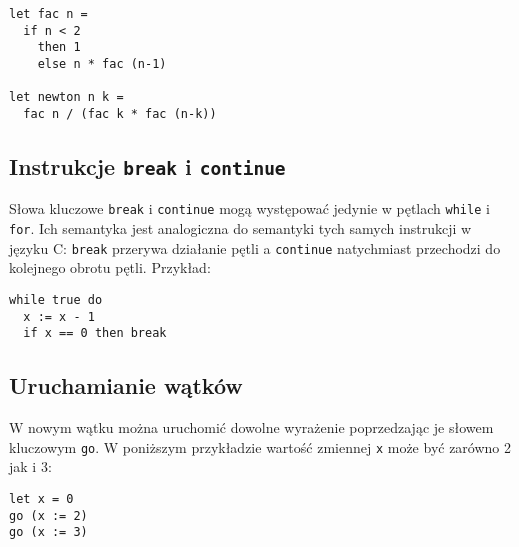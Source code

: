 \documentclass{documentation}
\begin{document}
\begin{verbatim}
let fac n =
  if n < 2
    then 1
    else n * fac (n-1)

let newton n k =
  fac n / (fac k * fac (n-k))
\end{verbatim}

\subsection{Instrukcje \texttt{break} i \texttt{continue}}
Słowa kluczowe \texttt{break} i \texttt{continue} mogą występować jedynie w pętlach
\texttt{while} i \texttt{for}. Ich semantyka jest analogiczna do semantyki tych samych
instrukcji w języku \textsc{C}: \texttt{break} przerywa działanie pętli a \texttt{continue}
natychmiast przechodzi do kolejnego obrotu pętli. Przykład:

\begin{verbatim}
while true do
  x := x - 1
  if x == 0 then break
\end{verbatim}

\subsection{Uruchamianie wątków}
W nowym wątku można uruchomić dowolne wyrażenie poprzedzając je słowem kluczowym
\texttt{go}. W poniższym przykładzie wartość zmiennej \texttt{x} może być
zarówno 2 jak i 3:

\begin{verbatim}
let x = 0
go (x := 2)
go (x := 3)
\end{verbatim}
\end{document}
